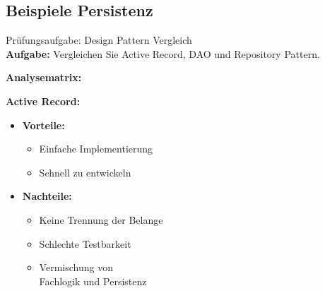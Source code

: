 \subsection{Beispiele Persistenz}

\begin{example2}{Prüfungsaufgabe: Design Pattern Vergleich}\\
\textbf{Aufgabe:}
Vergleichen Sie Active Record, DAO und Repository Pattern.

\textbf{Analysematrix:}

\begin{minipage}[t]{0.55\textwidth}
    \textbf{Active Record:}
    \begin{itemize}
        \item \textbf{Vorteile:}
        \begin{itemize}
            \item Einfache Implementierung
            \item Schnell zu entwickeln
        \end{itemize}
        \item \textbf{Nachteile:}
        \begin{itemize}
            \item Keine Trennung der Belange
            \item Schlechte Testbarkeit
            \item Vermischung von \\Fachlogik und Persistenz
        \end{itemize}
    \end{itemize}
    

\end{minipage}
\end{example2}
